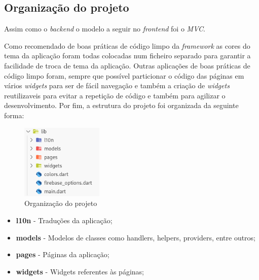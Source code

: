 \subsection{Organização do projeto}
Assim como o \textit{backend} o modelo a seguir no \textit{frontend} foi o \textit{MVC}. 

Como recomendado de boas práticas de código limpo da \textit{framework} as cores do tema da aplicação foram todas colocadas num ficheiro separado para garantir a facilidade de troca de tema da aplicação. Outras aplicações de boas práticas de código limpo foram, sempre que possível particionar o código das páginas em vários \textit{widgets} para ser de fácil navegação e também a criação de \textit{widgets} reutilizaveis para evitar a repetição de código e também para agilizar o desenvolvimento. Por fim, a estrutura do projeto foi organizada da seguinte forma:
\begin{figure}[htb]
  \centering
  \includegraphics[width=0.35\textwidth]{images/implementacao/frontend/organizacao_projeto.png}
  \caption{Organização do projeto}
  \label{fig:69}
\end{figure}

\begin{itemize}
  \item \textbf{l10n} - Traduções da aplicação;
  \item \textbf{models} - Modelos de classes como handlers, helpers, providers, entre outros;
  \item \textbf{pages} - Páginas da aplicação;
  \item \textbf{widgets} - Widgets referentes às páginas;
\end{itemize}
\vspace{50mm}

